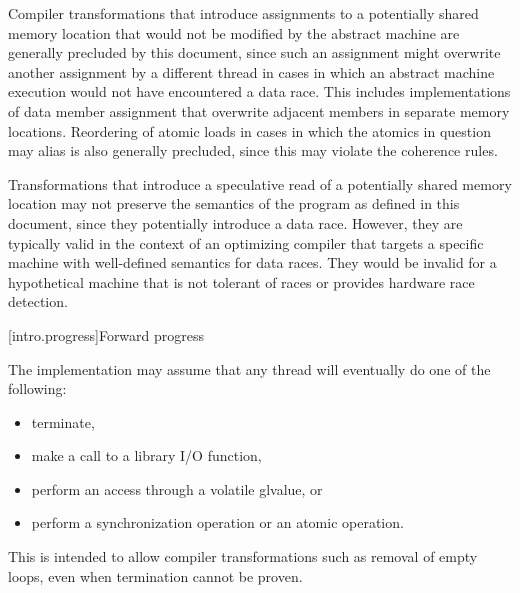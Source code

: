 \pnum
\begin{note} Compiler transformations that introduce assignments to a potentially
shared memory location that would not be modified by the abstract machine are
generally precluded by this document, since such an assignment might overwrite
another assignment by a different thread in cases in which an abstract machine
execution would not have encountered a data race. This includes implementations
of data member assignment that overwrite adjacent members in separate memory
locations. Reordering of atomic loads in cases in which the atomics in question
may alias is also generally precluded, since this may violate the coherence
rules. \end{note}

\pnum
\begin{note} Transformations that introduce a speculative read of a potentially
shared memory location may not preserve the semantics of the \Cpp program as
defined in this document, since they potentially introduce a data race. However,
they are typically valid in the context of an optimizing compiler that targets a
specific machine with well-defined semantics for data races. They would be
invalid for a hypothetical machine that is not tolerant of races or provides
hardware race detection. \end{note}

[intro.progress]{Forward progress}

\pnum
The implementation may assume that any thread will eventually do one of the
following:
\begin{itemize}
\item terminate,
\item make a call to a library I/O function,
\item perform an access through a volatile glvalue, or
\item perform a synchronization operation or an atomic operation.
\end{itemize}
\begin{note} This is intended to allow compiler transformations such as removal of
empty loops, even when termination cannot be proven. \end{note}

